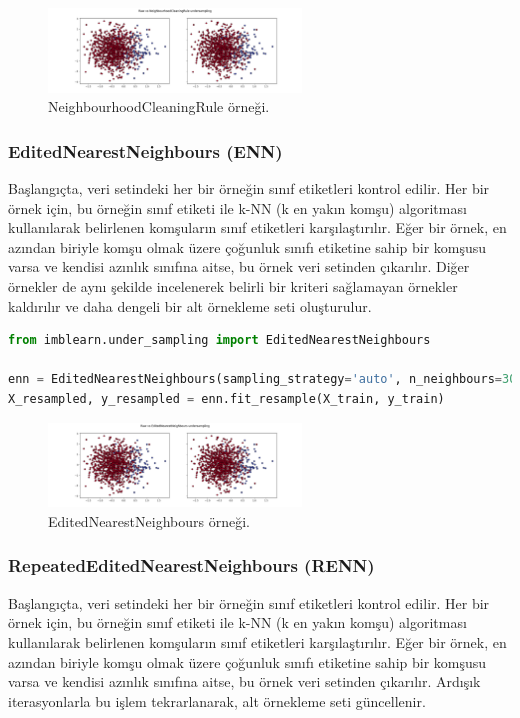 \begin{figure}[h]
    \centering
    \includegraphics[width=0.6\textwidth]{images/Raw vs NeighbourhoodCleaningRule undersampling.png}
    \caption{NeighbourhoodCleaningRule örneği.}
    \label{fig:enter-label}
\end{figure}

\subsubsection{EditedNearestNeighbours (ENN)}
Başlangıçta, veri setindeki her bir örneğin sınıf etiketleri kontrol edilir. Her bir örnek için, bu örneğin sınıf etiketi ile k-NN (k en yakın komşu) algoritması kullanılarak belirlenen komşuların sınıf etiketleri karşılaştırılır. Eğer bir örnek, en azından biriyle komşu olmak üzere çoğunluk sınıfı etiketine sahip bir komşusu varsa ve kendisi azınlık sınıfına aitse, bu örnek veri setinden çıkarılır. Diğer örnekler de aynı şekilde incelenerek belirli bir kriteri sağlamayan örnekler kaldırılır ve daha dengeli bir alt örnekleme seti oluşturulur.

\begin{lstlisting}[language=Python]
from imblearn.under_sampling import EditedNearestNeighbours

enn = EditedNearestNeighbours(sampling_strategy='auto', n_neighbours=300, kind_sel='all')
X_resampled, y_resampled = enn.fit_resample(X_train, y_train)
\end{lstlisting}

\begin{figure}[h]
    \centering
    \includegraphics[width=0.6\textwidth]{images/Raw vs EditedNearestNeighbours undersampling.png}
    \caption{EditedNearestNeighbours örneği.}
    \label{fig:enter-label}
\end{figure}

\subsubsection{RepeatedEditedNearestNeighbours (RENN)}
Başlangıçta, veri setindeki her bir örneğin sınıf etiketleri kontrol edilir. Her bir örnek için, bu örneğin sınıf etiketi ile k-NN (k en yakın komşu) algoritması kullanılarak belirlenen komşuların sınıf etiketleri karşılaştırılır. Eğer bir örnek, en azından biriyle komşu olmak üzere çoğunluk sınıfı etiketine sahip bir komşusu varsa ve kendisi azınlık sınıfına aitse, bu örnek veri setinden çıkarılır. Ardışık iterasyonlarla bu işlem tekrarlanarak, alt örnekleme seti güncellenir.

